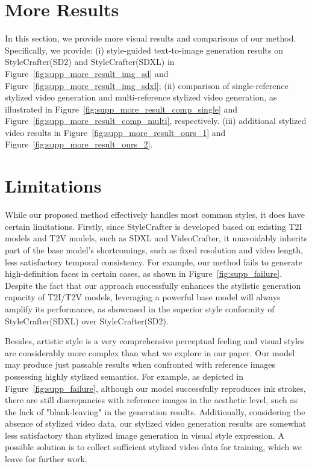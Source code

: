 \section{More Results}
\label{sec:supp_more_result}

In this section, we provide more visual results and comparisons of our method. Specifically, we provide: (i) style-guided text-to-image generation results on StyleCrafter(SD2) and StyleCrafter(SDXL) in Figure~\ref{fig:supp_more_result_img_sd} and Figure~\ref{fig:supp_more_result_img_sdxl}; (ii) comparison of single-reference stylized video generation and multi-reference stylized video generation, as illustrated in Figure~\ref{fig:supp_more_result_comp_single} and Figure~\ref{fig:supp_more_result_comp_multi}, respectively. (iii) additional stylized video results in Figure~\ref{fig:supp_more_result_ours_1} and Figure~\ref{fig:supp_more_result_ours_2}.



\section{Limitations}
\label{sec:supp_limitation}

While our proposed method effectively handles most common styles, it does have certain limitations. Firstly, since StyleCrafter is developed based on existing T2I models and T2V models, such as SDXL and VideoCrafter, it unavoidably inherits part of the base model's shortcomings, such as fixed resolution and video length, less satisfactory temporal consistency. For example, our method fails to generate high-definition faces in certain cases, as shown in Figure~\ref{fig:supp_failure}. Despite the fact that our approach successfully enhances the stylistic generation capacity of T2I/T2V models, leveraging a powerful base model will always amplify its performance, as showcased in the superior style conformity of StyleCrafter(SDXL) over StyleCrafter(SD2).

Besides, artistic style is a very comprehensive perceptual feeling and visual styles are considerably more complex than what we explore in our paper. Our model may produce just passable results when confronted with reference images possessing highly stylized semantics. For example, as depicted in Figure~\ref{fig:supp_failure}, although our model successfully reproduces ink strokes, there are still discrepancies with reference images in the aesthetic level, such as the lack of "blank-leaving" in the generation results. Additionally, considering the absence of stylized video data, our stylized video generation results are somewhat less satisfactory than stylized image generation in visual style expression. A possible solution is to collect sufficient stylized video data for training, which we leave for further work. 


